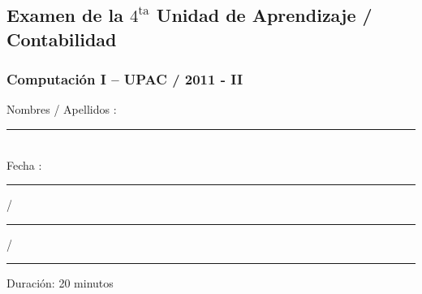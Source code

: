 \documentclass[10pt, a4paper]{article}
\begin{document}
\begin{center}
\subsection*{Examen de la $\text{4}^{\text{ta}}$ Unidad de Aprendizaje / Contabilidad} 
\subsubsection*{Computación I – UPAC / 2011 - II} 
\end{center}

\noindent Nombres / Apellidos : \rule{10cm}{0.4pt} \\ 
Fecha : \rule{2cm}{0.4pt}  / \rule{2cm}{0.4pt} / \rule{2cm}{0.4pt} \hspace{3.4cm} Duración: {\small 20 minutos} \\
\end{document}
